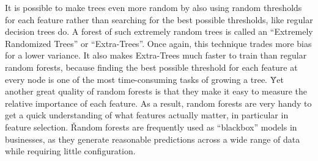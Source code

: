 It is possible to make trees even more random by also using random thresholds for each feature rather than searching
for the best possible thresholds, like regular decision trees do. A forest of such extremely random trees is called
an ``Extremely Randomized Trees'' or ``Extra-Trees''. Once again, this technique trades more bias for a lower variance.
It also makes Extra-Trees much faster to train than regular random forests, because finding the best possible
threshold for each feature at every node is one of the most time-consuming tasks of growing a tree. \v

Yet another great quality of random forests is that they make it easy to measure the relative importance of each
feature. As a result, random forests are very handy to get a quick understanding of what features actually matter, in
particular in feature selection. \v

Random forests are frequently used as ``blackbox'' models in businesses, as they generate reasonable predictions
across a wide range of data while requiring little configuration.